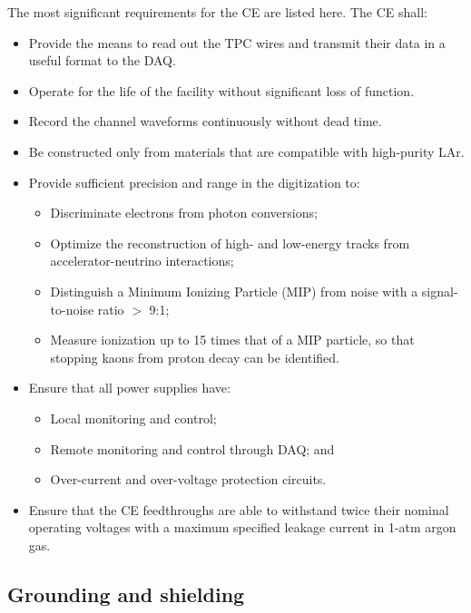 

The most significant requirements for the CE are listed here. The CE shall:

\begin{itemize}	
\item Provide the means to read out the TPC wires and transmit their data in a useful format to the DAQ.
\item Operate for the life of the facility without significant loss of function.
\item Record the channel waveforms continuously without dead time.
\item Be constructed only from materials that are compatible with high-purity LAr.
\item Provide sufficient precision and range in the digitization to:
\begin{itemize}
\item Discriminate electrons from photon conversions;
\item Optimize the reconstruction of high- and low-energy tracks from accelerator-neutrino interactions;
\item Distinguish a Minimum Ionizing Particle (MIP) from noise with a signal-to-noise ratio $>$ 9:1;
\item Measure  ionization up to 15 times that of a MIP particle, so that stopping kaons from proton decay can be identified.
\end{itemize}
\item Ensure that all power supplies have: 
\begin{itemize}
\item Local monitoring and control;
\item Remote monitoring and control through DAQ; and
\item Over-current and over-voltage protection circuits.
\end{itemize}
\item Ensure that the CE feedthroughs are able to withstand twice their nominal operating voltages 
with a maximum specified leakage current in 1-atm argon gas.
\end{itemize}


\subsection{Grounding and shielding}
\label{subsec:groundshield}

